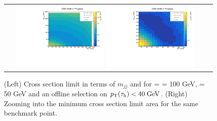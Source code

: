 \begin{figure}[tbh!]
	\centering
	\begin{tabular}{cc}
		\includegraphics[width=0.45\textwidth]{analysis/pics/JetInvMass_vs_MET_xsec_chi100_lsp050_taupt40.pdf}
		\includegraphics[width=0.45\textwidth]{analysis/pics/JetInvMass_vs_MET_xsec_chi100_lsp050_taupt40_zoom.pdf} 		
	\end{tabular}
	\caption{(Left) Cross section limit in terms of $m_{jj}$ and \met for \charginopm = \neutralinotwo = 100 GeV, \neutralinoone = 50 GeV and an offline selection on $p_{\text{T}}(\tau_{\text{h}}) <  40\;\text{Ge}\kern-0.06667em\text{V}$. (Right) Zooming into the minimum cross section limit area for the same benchmark point.}
	\label{fig::JetInvMass_vs_MET_xsec_chi100_lsp050_taupt40}
\end{figure}

